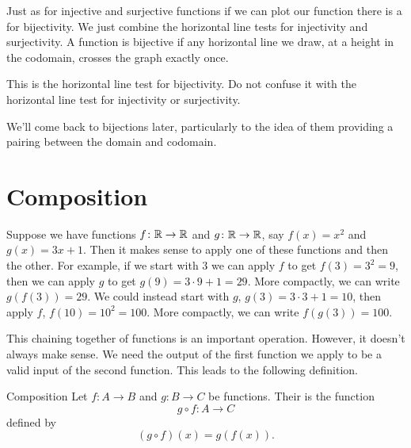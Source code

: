 \documentclass[fleqn]{LectureClass/LectureClass}
\begin{document}
    Just as for injective and surjective functions if we can plot our function there is a  for bijectivity.
    We just combine the horizontal line tests for injectivity and surjectivity.
    A function is bijective if any horizontal line we draw, at a height in the codomain, crosses the graph exactly once.
    
    \begin{wrn}
        This is the horizontal line test for bijectivity.
        Do not confuse it with the horizontal line test for injectivity or surjectivity.
    \end{wrn}
    
    We'll come back to bijections later, particularly to the idea of them providing a pairing between the domain and codomain.
    
    \section{Composition}
    Suppose we have functions \(f \colon \mathbb{R} \to \mathbb{R}\) and \(g \colon \mathbb{R} \to \mathbb{R}\), say \(f(x) = x^2\) and \(g(x) = 3x + 1\).
    Then it makes sense to apply one of these functions and then the other.
    For example, if we start with \(3\) we can apply \(f\) to get \(f(3) = 3^2 = 9\), then we can apply \(g\) to get \(g(9) = 3 \cdot 9 + 1 = 29\).
    More compactly, we can write \(g(f(3)) = 29\).
    We could instead start with \(g\), \(g(3) = 3 \cdot 3 + 1 = 10\), then apply \(f\), \(f(10) = 10^2 = 100\).
    More compactly, we can write \(f(g(3)) = 100\).
    
    This chaining together of functions is an important operation.
    However, it doesn't always make sense.
    We need the output of the first function we apply to be a valid input of the second function.
    This leads to the following definition.
    
    \begin{dfn}{Composition}{}
        Let \(f \colon A \to B\) and \(g \colon B \to C\) be functions.
        Their  is the function
        \begin{equation}
            g \circ f \colon A \to C
        \end{equation}
        defined by
        \begin{equation}
            (g \circ f) (x) = g(f(x)).
        \end{equation}
    \end{dfn}
    
\end{document}
